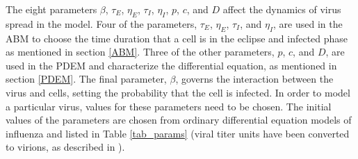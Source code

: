 The eight parameters $\beta$, $\tau_E$, $\eta_E$, $\tau_I$, $\eta_I$, $p$, $c$, and $D$ affect the dynamics of virus spread in the model. Four of the parameters, $\tau_E$, $\eta_E$, $\tau_I$, and $\eta_I$, are used in the ABM to choose the time duration that a cell is in the eclipse and infected phase as mentioned in section \ref{ABM}. Three of the other parameters, $p$, $c$, and $D$, are used in the PDEM and characterize the differential equation, as mentioned in section \ref{PDEM}. The final parameter, $\beta$, governs the interaction between the virus and cells, setting the probability that the cell is infected. In order to model a particular virus, values for these parameters need to be chosen. The initial values of the parameters are chosen from ordinary differential equation models of influenza and listed in Table \ref{tab_params} (viral titer units have been converted to virions, as described in \cite{dobrovolny17}). %

\begin{table}
\caption{Parameter values to simulate an influenza infection with the ABM/PDEM model.\label{tab_params}}
\end{table}


